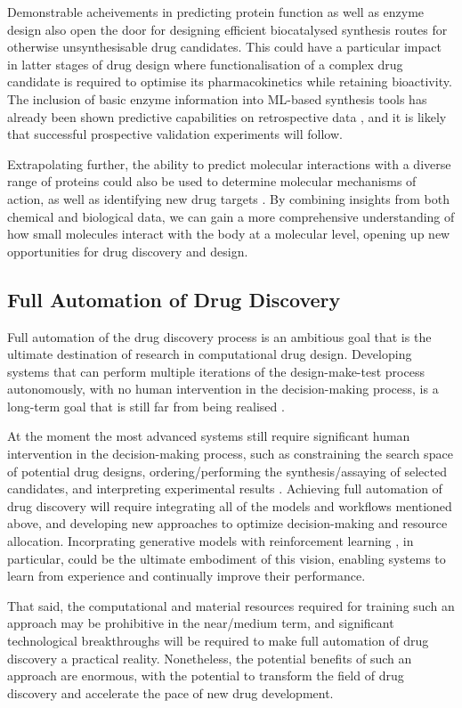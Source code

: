Demonstrable acheivements in predicting protein function \cite{Bileschi2022ProteinAnnotation} as well as enzyme design \cite{Yeh2023DeNovoLuciferase} also open the door for designing efficient biocatalysed synthesis routes for otherwise unsynthesisable drug candidates. This could have a particular impact in latter stages of drug design where functionalisation of a complex drug candidate is required to optimise its pharmacokinetics while retaining bioactivity. The inclusion of basic enzyme information into ML-based synthesis tools has already been shown predictive capabilities on retrospective data \cite{Probst2022Biocatalysis}, and it is likely that successful prospective validation experiments will follow.

Extrapolating further, the ability to predict molecular interactions with a diverse range of proteins could also be used to determine molecular mechanisms of action, as well as identifying new drug targets \cite{Schenone2013TargetID}. By combining insights from both chemical and biological data, we can gain a more comprehensive understanding of how small molecules interact with the body at a molecular level, opening up new opportunities for drug discovery and design.

\subsection{Full Automation of Drug Discovery}
Full automation of the drug discovery process is an ambitious goal that is the ultimate destination of research in computational drug design. Developing systems that can perform multiple iterations of the design-make-test process autonomously, with no human intervention in the decision-making process, is a long-term goal that is still far from being realised \cite{Coley2019AutonomousProgress,Coley2019AutonomousOutlook, Schneider2018AutomatingDrugDiscovery}.

At the moment the most advanced systems still require significant human intervention in the decision-making process, such as constraining the search space of potential drug designs, ordering/performing the synthesis/assaying of selected candidates, and interpreting experimental results \cite{Goldman2022ChemicalDesignLevels}. Achieving full automation of drug discovery will require integrating all of the models and workflows mentioned above, and developing new approaches to optimize decision-making and resource allocation. Incorprating generative models with reinforcement learning \cite{Popova2018DeepRL, Zhou2019Optimization, born2019paccmannrl,Chenthamarakshan2022IBMGenCoV}, in particular, could be the ultimate embodiment of this vision, enabling systems to learn from experience and continually improve their performance.

That said, the computational and material resources required for training such an approach may be prohibitive in the near/medium term, and significant technological breakthroughs will be required to make full automation of drug discovery a practical reality. Nonetheless, the potential benefits of such an approach are enormous, with the potential to transform the field of drug discovery and accelerate the pace of new drug development.
